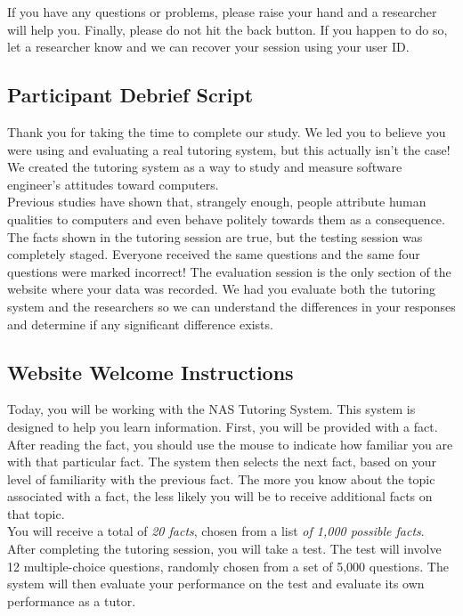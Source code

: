 \documentclass{sig-alternate-05-2015}
\begin{document}
\noindent If you have any questions or problems, please raise your hand and a researcher will help you. Finally, please do not hit the back button. If you happen to do so, let a researcher know and we can recover your session using your user ID.

\subsection{Participant Debrief Script}

\noindent Thank you for taking the time to complete our study. We led you to believe you were using and evaluating a real tutoring system, but this actually isn't the case! We created the tutoring system as a way to study and measure software engineer's attitudes toward computers.\\

\noindent Previous studies have shown that, strangely enough, people attribute human qualities to computers and even behave politely towards them as a consequence. The facts shown in the tutoring session are true, but the testing session was completely staged. Everyone received the same questions and the same four questions were marked incorrect! The evaluation session is the only section of the website where your data was recorded. We had you evaluate both the tutoring system and the researchers so we can understand the differences in your responses and determine if any significant difference exists. 

\subsection{Website Welcome Instructions}
\noindent Today, you will be working with the NAS Tutoring System. This system is designed to help you learn information. First, you will be provided with a fact. After reading the fact, you should use the mouse to indicate how familiar you are with that particular fact. The system then selects the next fact, based on your level of familiarity with the previous fact. The more you know about the topic associated with a fact, the less likely you will be to receive additional facts on that topic.\\
				
\noindent You will receive a total of \emph{20 facts}, chosen from a list \emph{of 1,000 possible facts}. After completing the tutoring session, you will take a test. The test will involve 12 multiple-choice questions, randomly chosen from a set of 5,000 questions. The system will then evaluate your performance on the test and evaluate its own performance as a tutor.
\end{document}
